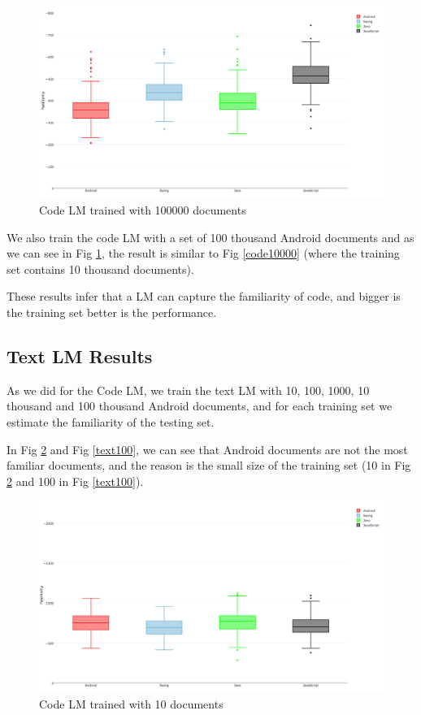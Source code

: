 \documentclass[12pt,mscthesis]{usiinfthesis}
\begin{document}
{\begin{figure}[H]
			\centering
			\includegraphics[width=\textwidth]{code100000}
			\caption{Code LM trained with 100000 documents}
			\label{code100000}
\end{figure}	

 We also train the code LM with a set of 100 thousand Android documents and as we can see in Fig \ref{code100000}, the result is similar to Fig \ref{code10000} (where the training set contains 10 thousand documents).

These results infer that a LM can capture the familiarity of code, and bigger is the training set better is the performance.


\subsection{Text LM Results}

 As we did for the Code LM, we train the text LM with 10, 100, 1000, 10 thousand and 100 thousand Android documents, and for each training set we estimate the familiarity of the testing set.\newpage
	
In Fig \ref{text10} and Fig \ref{text100}, we can see that Android documents are not the most familiar documents, and the reason is the small size of the training set (10 in Fig \ref{text10} and 100 in Fig \ref{text100}).

\begin{figure}[H]
			\centering
			\includegraphics[width=\textwidth]{text10}
			\caption{Code LM trained with 10 documents}
			\label{text10}
\end{figure}

}
\end{document}
